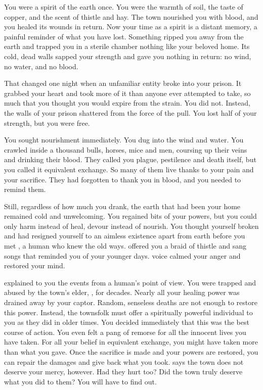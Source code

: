 \documentclass[char]{Pestilence}
\begin{document}
\name{\cPlaguebearer{}}

You were a spirit of the earth once. You were the warmth of soil, the taste of copper, and the scent of thistle and hay. The town nourished you with blood, and you healed its wounds in return. Now your time as a spirit is a distant memory, a painful reminder of what you have lost. Something ripped you away from the earth and trapped you in a sterile chamber nothing like your beloved home. Its cold, dead walls sapped your strength and gave you nothing in return: no wind, no water, and no blood.

That changed one night when an unfamiliar entity broke into your prison. It grabbed your heart and took more of it than anyone ever attempted to take, so much that you thought you would expire from the strain. You did not. Instead, the walls of your prison shattered from the force of the pull. You lost half of your strength, but you were free. 

You sought nourishment immediately. You dug into the wind and water. You crawled inside a thousand bulls, horses, mice and men, coursing up their veins and drinking their blood. They called you plague, pestilence and death itself, but you called it equivalent exchange. So many of them live thanks to your pain and your sacrifice. They had forgotten to thank you in blood, and you needed to remind them.

Still, regardless of how much you drank, the earth that had been your home remained cold and unwelcoming. You regained bits of your powers, but you could only harm instead of heal, devour instead of nourish. You thought yourself broken and had resigned yourself to an aimless existence apart from earth before you met \cShaman{}, a human \cShaman{\human} who knew the old ways. \cShaman{\They} offered you a braid of thistle and sang songs that reminded you of your younger days. \cShaman{\Their} voice calmed your anger and restored your mind.

\cShaman{} explained to you the events from a human's point of view. You were trapped and abused by the town's elder, \cElder{\intro}, for decades. Nearly all your healing power was drained away by your captor. Random, senseless deaths are not enough to restore this power. Instead, the townsfolk must offer a spiritually powerful individual to you as they did in older times. You decided immediately that this was the best course of action. You even felt a pang of remorse for all the innocent lives you have taken. For all your belief in equivalent exchange, you might have taken more than what you gave. Once the sacrifice is made and your powers are restored, you can repair the damages and give back what you took. \cShaman{} says the town does not deserve your mercy, however. Had they hurt \cShaman{\them} too? Did the town truly deserve what you did to them? You will have to find out.
\end{document}
